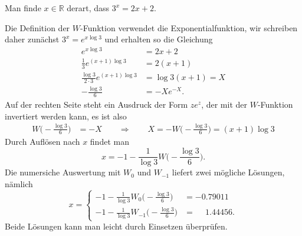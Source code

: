 Man finde $x\in\mathbb{R}$ derart, dass $3^x=2x+2$.

\begin{loesung}
Die Definition der $W$-Funktion verwendet die Exponentialfunktion,
wir schreiben daher zunächst $3^x = e^{x\log 3}$ und erhalten so
die Gleichung
\begin{align*}
e^{x\log 3} &= 2x+2
\\
\frac{1}{3}e^{(x+1)\log 3}
&=2(x+1)
\\
\frac{\log 3}{2\cdot 3}e^{(x+1)\log 3}
&=\log 3(x+1)
=
X
\\
-\frac{\log 3}{6}
&=
-Xe^{-X}.
\end{align*}
Auf der rechten Seite steht ein Ausdruck der Form $ze^z$, der mit der
$W$-Funktion invertiert werden kann, es ist also
\begin{align*}
W\biggl(
-\frac{\log 3}{6}
\biggr)
&=
-X
\qquad\Rightarrow\qquad
X=
-W\biggl(
-\frac{\log 3}{6}
\biggr)
=
(x+1)
\log 3
\end{align*}
Durch Auflösen nach $x$ findet man
\[
x
=
-1
-
\frac{1}{\log 3}
W\biggl(
-\frac{\log 3}{6}
\biggr).
\]
Die numersiche Auswertung mit $W_0$ und $W_{-1}$ liefert zwei mögliche
Lösungen, nämlich
\[
x
=
\begin{cases}
\displaystyle -1-\frac{1}{\log 3} W_0\biggl(-\frac{\log 3}{6}\biggr)&=-0.79011\\
\displaystyle -1-\frac{1}{\log 3} W_{-1}\biggl(-\frac{\log 3}{6}\biggr)&=\phantom{-}1.44456.
\end{cases}
\]
Beide Lösungen kann man leicht durch Einsetzen überprüfen.
\end{loesung}
